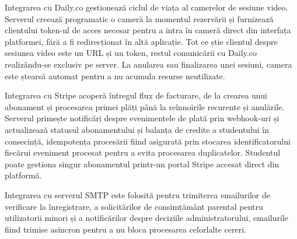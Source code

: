 Integrarea cu Daily.co gestionează ciclul de viața al camerelor de sesiune video. Serverul creează programatic o cameră la momentul rezervării și furnizează clientului token-ul de acces necesar pentru a intra în cameră direct din interfața platformei, fără a fi redirecționat în altă aplicație. Tot ce știe clientul despre sesiunea video este un URL și un token, restul comunicării cu Daily.co realizându-se exclusiv pe server. La anularea sau finalizarea unei sesiuni, camera este ștearsă automat pentru a nu acumula resurse neutilizate.

Integrarea cu Stripe acoperă întregul flux de facturare, de la crearea unui abonament și procesarea primei plăți până la reînnoirile recurente și anulările. Serverul primește notificări despre evenimentele de plată prin webhook-uri și actualizează statusul abonamentului și balanța de credite a studentului în consecință, idempotența procesării fiind asigurată prin stocarea identificatorului fiecărui eveniment procesat pentru a evita procesarea duplicatelor. Studentul poate gestiona singur abonamentul printr-un portal Stripe accesat direct din platformă.

Integrarea cu serverul SMTP este folosită pentru trimiterea emailurilor de verificare la înregistrare, a solicitărilor de consimțământ parental pentru utilizatorii minori și a notificărilor despre deciziile administratorului, emailurile fiind trimise asincron pentru a nu bloca procesarea celorlalte cereri.
